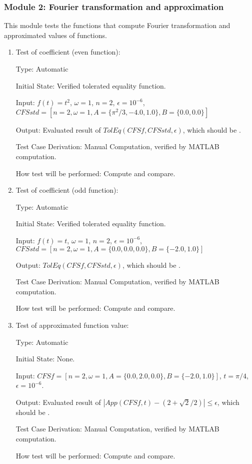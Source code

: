 \documentclass[12pt, titlepage]{article}
\begin{document}
\subsubsection{Module 2: Fourier transformation and approximation}
This module tests the functions that compute Fourier transformation and
approximated values of functions.

\begin{enumerate}
	\item{Test of coefficient (even function):\\}
	
	Type: Automatic
	
	Initial State: Verified tolerated equality function.
	
	Input: $f(t)=t^2$, $\omega=1$, $n=2$, $\epsilon=10^{-6}$,
        $\mathit{CFSstd}=[n=2,\omega=1, A=\{\pi^2/3, -4.0, 1.0\}, B=\{0.0,
        0.0\}]$
	
	Output: Evaluated result of
        $\mathit{TolEq}(\mathit{CFSf}, \mathit{CFSstd}, \epsilon)$, which should
        be .
	
	Test Case Derivation: Manual Computation, verified by MATLAB
        computation.
	
	How test will be performed: Compute and compare.
	
	\item{Test of coefficient (odd function):\\}
	
	Type: Automatic	
	
	Initial State: Verified tolerated equality function.
	
	Input: $f(t)=t$, $\omega=1$, $n=2$, $\epsilon=10^{-6}$,
        $\mathit{CFSstd}=[n=2,\omega=1, A=\{0.0, 0.0, 0.0\}, B=\{-2.0, 1.0\}]$
	
	Output: $\mathit{TolEq}(\mathit{CFSf}, \mathit{CFSstd}, \epsilon)$,
        which should be .
	
	Test Case Derivation: Manual Computation, verified by MATLAB computation.
	
	How test will be performed: Compute and compare.
	
	\item{Test of approximated function value: \\}
	
	Type: Automatic
	
	Initial State: None.
	
	Input: $\mathit{CFSf}=[n=2,\omega=1, A=\{0.0, 2.0, 0.0\}, B=\{-2.0,
        1.0\}]$, $t=\pi/4$, $\epsilon=10^{-6}$.
	
	Output: Evaluated result of
        $|\mathit{App}(\mathit{CFSf}, t)-(2+\sqrt{2}/2)|\leq\epsilon$, which
        should be .
	
	Test Case Derivation: Manual Computation, verified by MATLAB
        computation.
	
	How test will be performed: Compute and compare.
	
\end{enumerate}
\end{document}
